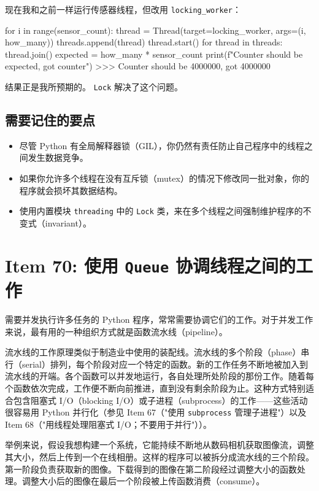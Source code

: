 现在我和之前一样运行传感器线程，但改用 \texttt{locking\_worker}：

\begin{codebox}[python]
for i in range(sensor_count):
    thread = Thread(target=locking_worker, args=(i, how_many))
    threads.append(thread)
    thread.start()
for thread in threads:
    thread.join()
expected = how_many * sensor_count
print(f"Counter should be {expected}, got {counter}")
>>>
Counter should be 4000000, got 4000000
\end{codebox}

结果正是我所预期的。 \texttt{Lock} 解决了这个问题。

\subsection{需要记住的要点}

\begin{itemize}
\item 尽管 Python 有全局解释器锁（GIL），你仍然有责任防止自己程序中的线程之间发生数据竞争。
\item 如果你允许多个线程在没有互斥锁（mutex）的情况下修改同一批对象，你的程序就会损坏其数据结构。
\item 使用内置模块 \texttt{threading} 中的 \texttt{Lock} 类，来在多个线程之间强制维护程序的不变式（invariant）。
\end{itemize}

\section{Item 70: 使用 \texttt{Queue} 协调线程之间的工作}

需要并发执行许多任务的 Python 程序，常常需要协调它们的工作。对于并发工作来说，最有用的一种组织方式就是函数流水线（pipeline）。

流水线的工作原理类似于制造业中使用的装配线。流水线的多个阶段（phase）串行（serial）排列，每个阶段对应一个特定的函数。新的工作任务不断地被加入到流水线的开端。各个函数可以并发地运行，各自处理所处阶段的那份工作。随着每个函数依次完成，工作便不断向前推进，直到没有剩余阶段为止。这种方式特别适合包含阻塞式 I/O（blocking I/O）或子进程（subprocess）的工作——这些活动很容易用 Python 并行化（参见 Item 67（"使用 \texttt{subprocess} 管理子进程"）以及 Item 68（"用线程处理阻塞式 I/O；不要用于并行"））。

举例来说，假设我想构建一个系统，它能持续不断地从数码相机获取图像流，调整其大小，然后上传到一个在线相册。这样的程序可以被拆分成流水线的三个阶段。第一阶段负责获取新的图像。下载得到的图像在第二阶段经过调整大小的函数处理。调整大小后的图像在最后一个阶段被上传函数消费（consume）。

